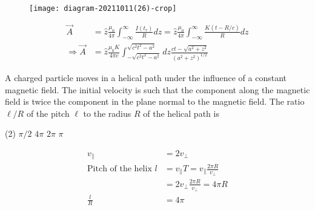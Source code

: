\begin{enumerate}
\begin{tasks}
\end{tasks}
\begin{answer}$\left. \right. $\\
	\begin{figure}[H]
		\centering
		\texttt{[image: diagram-20211011(26)-crop]}
	\end{figure}
	 \begin{align*}
	\vec{A} &=\hat{z} \frac{\mu_{0}}{4 \pi} \int_{-\infty}^{\infty} \frac{I\left(t_{r}\right)}{R} d z=\hat{z} \frac{\mu_{0}}{4 \pi} \int_{-\infty}^{\infty} \frac{K(t-R / c)}{R} d z \\
	\Rightarrow \vec{A} &=\hat{z} \frac{\mu_{0} K}{4 \pi c} \int_{-\sqrt{c^{2} t^{2}-a^{2}}}^{\sqrt{c^{2} t^{2}-a^{2}}} d z \frac{c t-\sqrt{a^{2}+z^{2}}}{\left(a^{2}+z^{2}\right)^{1 / 2}}
	\end{align*}
\end{answer}
\begin{minipage}{\textwidth}
	\item A charged particle moves in a helical path under the influence of a constant magnetic field. The initial velocity is such that the component along the magnetic field is twice the component in the plane normal to the magnetic field.
	The ratio $\ell / R$ of the pitch $\ell$ to the radius $R$ of the helical path is
\end{minipage}
\begin{tasks}(2)
	\task[\textbf{A.}] $\pi / 2$
	\task[\textbf{B.}]$4 \pi$
	\task[\textbf{C.}]$2 \pi$
	\task[\textbf{D.}]$\pi$
\end{tasks}
\begin{answer}
	\begin{align*}
	v_{\|}&=2 v_{\perp}\\
	\text{Pitch of the helix }l&=v_{\|} T=v_{\|} \frac{2 \pi R}{v_{\perp}}\\&=2 v_{\perp} \frac{2 \pi R}{v_{\perp}}=4 \pi R \\ \frac{l}{R}&=4 \pi
	\end{align*}
	

\end{answer}
\end{enumerate}

